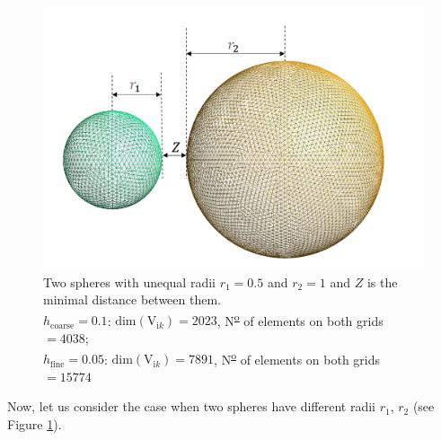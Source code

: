 \begin{figure}[H]
    \centering
    \includegraphics[scale = 0.5]{figures/Sphere_unequal_radii.png}
    \caption{Two spheres with unequal radii $r_{1} = 0.5$ and $r_{2} = 1$ and $Z$ is the minimal distance between them.\\
    \hspace*{1.5cm}$h_{\text{coarse}} = 0.1$: $\text{dim}(\mathrm{V}_{\mathrm{i}k}) = 2023$,  N\textsuperscript{\underline{o}} of elements on both grids $ = 4038$;\\
    \hspace*{1.5cm}$h_{\text{fine}} = 0.05$: $\text{dim}(\mathrm{V}_{\mathrm{i}k}) = 7891$,  N\textsuperscript{\underline{o}} of elements on both grids $ = 15774$}
    \label{Two spheres with unequal radii}
\end{figure}

Now, let us consider the case when two spheres have different radii $r_{1}$, $r_{2}$ (see Figure \ref{Two spheres with unequal radii}). 




